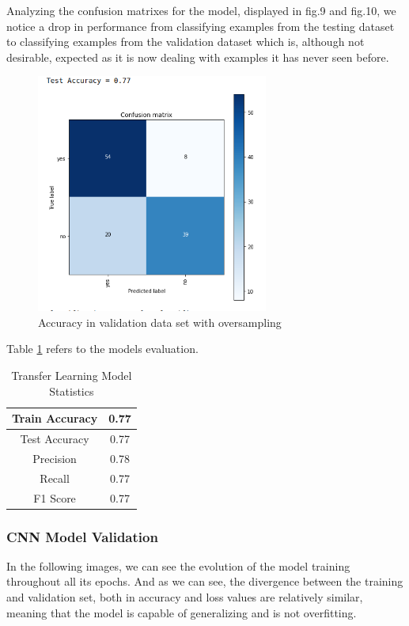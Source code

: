 \documentclass[conference]{IEEEtran}
\begin{document}
Analyzing the confusion matrixes for the model, displayed in fig.9 and fig.10, we notice a drop in performance from classifying examples from the testing dataset to classifying examples from the validation dataset which is, although not desirable, expected as it is now dealing with examples it has never seen before.\\

\begin{figure}[H]
    \centering
    \includegraphics[width=3in]{SVM_final_accuracy.png}
    \caption{Accuracy in validation data set with oversampling}\label{fig:fig11}
\end{figure}

Table \ref{table:1} refers to the models evaluation.

\begin{table}[htbp]
\centering
\caption{Transfer Learning Model Statistics}
\begin{center}
\begin{tabular}{|c|c|}
\hline
Train Accuracy & 0.77 \\
\hline
Test Accuracy & 0.77 \\
\hline
Precision & 0.78\\
\hline
Recall & 0.77\\
\hline
F1 Score & 0.77 \\
\hline
\end{tabular}
\end{center}
\label{table:1}
\end{table}

\subsubsection{CNN Model Validation}\n
In the following images, we can see the evolution of the model training throughout all its epochs. And as we can see, the divergence between the training and validation set, both in accuracy and loss values are relatively similar, meaning that the model is capable of generalizing and is not overfitting.
\end{document}

